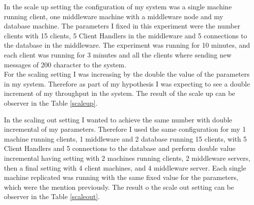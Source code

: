 In the scale up setting the configuration of my system was a single machine running client, one middleware machine with a middleware node and my database machine. The parameters I fixed in this experiment were the number clients with 15 clients, 5 Client Handlers in the middleware and 5 connections to the database in the middleware. The experiment was running for 10 minutes, and each client was running for 3 minutes and all the clients where sending new messages of 200 character to the system.\\

For the scaling setting I was increasing by the double the value of the parameters in my system. Therefore as part of my hypothesis I was expecting to see a double increment of my throughput in the system. The result of the scale up can be observer in the Table \ref{scaleup}.\\

\begin{table}\centering
         \caption{}
         \label{scaleup}
 \end{table}
 In the scaling out setting I wanted to achieve the same number with double incremental of my parameters. Therefore I used the same configuration for my 1 machine running clients, 1 middleware and 2 database running 15 clients, with 5 Client Handlers and 5 connections to the database and perform double value incremental having setting with 2 machines running clients, 2 middleware servers, then a final setting with 4 client machines, and 4 middleware server. Each single machine replicated was running with the same fixed value for the parameters, which were the mention previously. The result o the scale out setting can be observer in the Table \ref{scaleout}.\\
 
